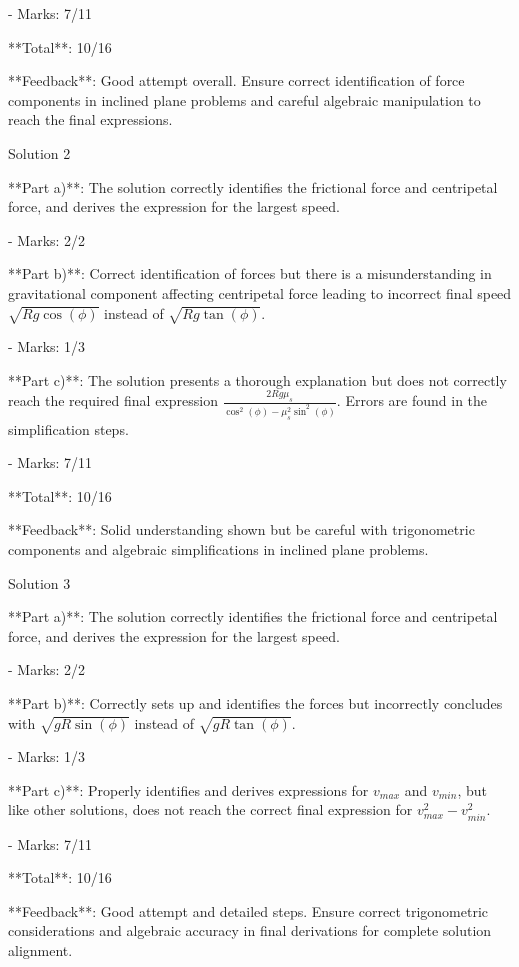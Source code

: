 \documentclass[a4paper,11pt]{article}
\begin{document}
- Marks: 7/11

**Total**: 10/16

**Feedback**: Good attempt overall. Ensure correct identification of force components in inclined plane problems and careful algebraic manipulation to reach the final expressions. 

Solution 2

**Part a)**: The solution correctly identifies the frictional force and centripetal force, and derives the expression for the largest speed.

- Marks: 2/2

**Part b)**: Correct identification of forces but there is a misunderstanding in gravitational component affecting centripetal force leading to incorrect final speed \( \sqrt{Rg\cos(\phi)} \) instead of \( \sqrt{Rg\tan(\phi)} \).

- Marks: 1/3

**Part c)**: The solution presents a thorough explanation but does not correctly reach the required final expression \( \frac{2Rg\mu_s}{\cos^2(\phi) - \mu_s^2 \sin^2(\phi)} \). Errors are found in the simplification steps.

- Marks: 7/11

**Total**: 10/16

**Feedback**: Solid understanding shown but be careful with trigonometric components and algebraic simplifications in inclined plane problems.

Solution 3

**Part a)**: The solution correctly identifies the frictional force and centripetal force, and derives the expression for the largest speed.

- Marks: 2/2

**Part b)**: Correctly sets up and identifies the forces but incorrectly concludes with \( \sqrt{gR \sin(\phi)} \) instead of \( \sqrt{gR\tan(\phi)} \).

- Marks: 1/3

**Part c)**: Properly identifies and derives expressions for \( v_{max} \) and \( v_{min} \), but like other solutions, does not reach the correct final expression for \( v_{max}^2 - v_{min}^2 \).

- Marks: 7/11

**Total**: 10/16

**Feedback**: Good attempt and detailed steps. Ensure correct trigonometric considerations and algebraic accuracy in final derivations for complete solution alignment. 
\end{document}
